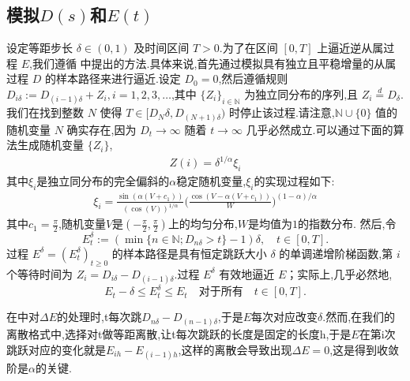 \subsection{模拟$D(s)$和$E(t)$}
设定等距步长 $\delta \in (0,1)$ 及时间区间 $T > 0$.为了在区间 $[0,T]$ 上逼近逆从属过程 $E$,我们遵循 \cite{magdziarz2009stochastic} 中提出的方法.具体来说,首先通过模拟具有独立且平稳增量的从属过程 $D$ 的样本路径来进行逼近.设定 $D_0 = 0$,然后遵循规则 $D_{i\delta} := D_{(i-1)\delta} + Z_i, i=1,2,3,\ldots$,其中 $\{Z_i\}_{i \in \mathbb{N}}$ 为独立同分布的序列,且 $Z_i \stackrel{d}{=} D_{\delta}$.我们在找到整数 $N$ 使得 $T \in [D_N\delta, D_{(N+1)\delta})$ 时停止该过程.请注意,$\mathbb{N}\cup\{0\}$ 值的随机变量 $N$ 确实存在,因为 $D_t \to \infty$ 随着 $t \to \infty$ 几乎必然成立.可以通过下面的算法生成随机变量 $\{Z_i\}$,
\begin{align*}
	Z(i)=\delta^{1/\alpha}\xi_{i}
\end{align*}
其中$\xi_i$是独立同分布的完全偏斜的$\alpha$稳定随机变量,$\xi_i$的实现过程如下:
\begin{align*}
	\xi_i=\frac{\sin(\alpha(V+c_1))}{\left(\cos(V)\right)^{1/\alpha}}\Big(\frac{\cos(V-\alpha(V+c_1))}{W}\Big)^{(1-\alpha)/\alpha}
\end{align*}
其中$c_1 = \frac{\pi}{2}$,随机变量$V$是$(-\frac{\pi}{2},\frac{\pi}{2})$上的均匀分布,$W$是均值为$1$的指数分布.
然后,令
$$
E_t^\delta := \left(\min\{n \in \mathbb{N}; D_{n\delta} > t\} - 1\right)\delta, \quad t \in [0, T].
$$
过程 $E^\delta = (E_t^\delta)_{t \geq 0}$ 的样本路径是具有恒定跳跃大小 $\delta$ 的单调递增阶梯函数,第 $i$ 个等待时间为 $Z_i = D_{i\delta} - D_{(i-1)\delta}$.过程 $E^\delta$ 有效地逼近 $E$；实际上,几乎必然地,
$$
E_t - \delta \leq E_t^\delta \leq E_t \quad \text{对于所有} \quad t \in [0, T].
$$

在\cite{jin2019strong}中对$\Delta E$的处理时,t每次跳$D_{n\delta} - D_{(n-1)\delta}$,于是$E$每次对应改变$\delta$.然而,在我们的离散格式中,选择对t做等距离散,让t每次跳跃的长度是固定的长度h,于是$E$在第i次跳跃对应的变化就是$E_{ih} - E_{(i-1)h}$,这样的离散会导致出现$\Delta E=0$,这是得到收敛阶是$\alpha$的关键.


